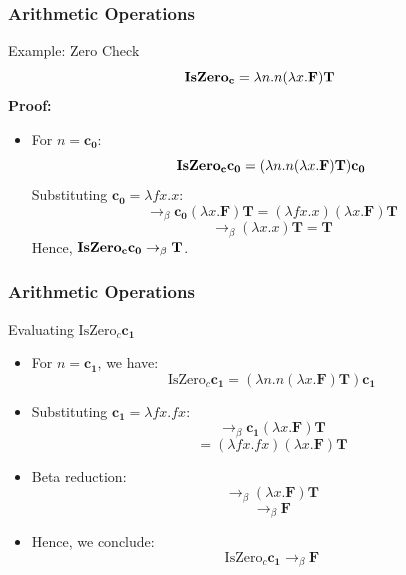 \documentclass{beamer}
\begin{document}
\begin{frame}
  \frametitle{Arithmetic Operations}

  \begin{block}{Example: Zero Check}
    \[
    \text{\textbf{IsZero}}_\text{\textbf{c}} = \lambda n. n (\lambda x. \mathbf{F}) \mathbf{T}
    \]
    \textbf{Proof:}
    \begin{itemize}
      \item For \(n = \mathbf{c_0}\):
      \[
      \text{\textbf{IsZero}}_\text{\textbf{c}} \mathbf{c_0} = (\lambda n. n (\lambda x. \mathbf{F}) \mathbf{T}) \mathbf{c_0}
      \]
      Substituting \(\mathbf{c_0} = \lambda fx. x\):
      \[
      \rightarrow_\beta \mathbf{c_0} (\lambda x. \mathbf{F}) \mathbf{T} = (\lambda fx. x) (\lambda x. \mathbf{F}) \mathbf{T}
      \]
      \[
      \rightarrow_\beta (\lambda x.x) \mathbf{T} = \mathbf{T}
      \]
      Hence, \(\text{\textbf{IsZero}}_\text{\textbf{c}} \mathbf{c_0} \rightarrow_\beta \mathbf{T}\).

    \end{itemize}
  \end{block}
\end{frame}

\begin{frame}
  \frametitle{Arithmetic Operations}

  \begin{block}{Evaluating \(\text{IsZero}_c \mathbf{c_1}\)}
    \begin{itemize}
      \item For \( n = \mathbf{c_1} \), we have:
      \[
      \text{IsZero}_c \mathbf{c_1} = (\lambda n. n (\lambda x. \mathbf{F}) \mathbf{T}) \mathbf{c_1}
      \]
      \item Substituting \( \mathbf{c_1} = \lambda fx. f x \):
      \[
      \rightarrow_\beta \mathbf{c_1} (\lambda x. \mathbf{F}) \mathbf{T}
      \]
      \[
      = (\lambda fx. f x) (\lambda x. \mathbf{F}) \mathbf{T}
      \]
      \item Beta reduction:
      \[
      \rightarrow_\beta (\lambda x. \mathbf{F}) \mathbf{T}
      \]
      \[
      \rightarrow_\beta \mathbf{F}
      \]
      \item Hence, we conclude:
      \[
      \text{IsZero}_c \mathbf{c_1} \rightarrow_\beta \mathbf{F}
      \]
    \end{itemize}
  \end{block}
\end{frame}
\end{document}
